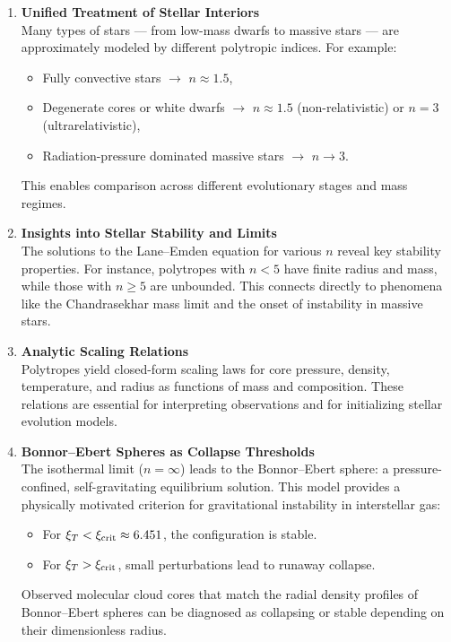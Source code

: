 \begin{enumerate}
    \item \textbf{Unified Treatment of Stellar Interiors} \\
    Many types of stars — from low-mass dwarfs to massive stars — are approximately modeled by different polytropic indices. For example:
    \begin{itemize}
        \item Fully convective stars $\rightarrow$ $n \approx 1.5$,
        \item Degenerate cores or white dwarfs $\rightarrow$ $n \approx 1.5$ (non-relativistic) or $n = 3$ (ultrarelativistic),
        \item Radiation-pressure dominated massive stars $\rightarrow$ $n \rightarrow 3$.
    \end{itemize}
    This enables comparison across different evolutionary stages and mass regimes.

    \item \textbf{Insights into Stellar Stability and Limits} \\
    The solutions to the Lane–Emden equation for various $n$ reveal key stability properties. For instance, polytropes with $n < 5$ have finite radius and mass, while those with $n \geq 5$ are unbounded. This connects directly to phenomena like the Chandrasekhar mass limit and the onset of instability in massive stars.

    \item \textbf{Analytic Scaling Relations} \\
    Polytropes yield closed-form scaling laws for core pressure, density, temperature, and radius as functions of mass and composition. These relations are essential for interpreting observations and for initializing stellar evolution models.

    \item \textbf{Bonnor–Ebert Spheres as Collapse Thresholds} \\
    The isothermal limit ($n = \infty$) leads to the Bonnor–Ebert sphere: a pressure-confined, self-gravitating equilibrium solution. This model provides a physically motivated criterion for gravitational instability in interstellar gas:
    \begin{itemize}
        \item For $\xi_T < \xi_{\rm crit} \approx 6.451$, the configuration is stable.
        \item For $\xi_T > \xi_{\rm crit}$, small perturbations lead to runaway collapse.
    \end{itemize}
    Observed molecular cloud cores that match the radial density profiles of Bonnor–Ebert spheres can be diagnosed as collapsing or stable depending on their dimensionless radius.


\end{enumerate}

